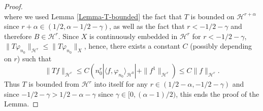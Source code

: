 \documentclass[11pt, dvipsnames]{amsart}
\begin{document}
{\begin{proof}
\begin{equation}
\end{equation}
where we used Lemma \ref{Lemma-T-bounded} the fact that $T$ is bounded on $\mathcal{H}^{r+\alpha}$ since $r+\alpha\in(1/2,\alpha-1/2-\gamma)$, as well as the fact that $r< -1/2-\gamma$ and therefore $B\in\mathcal{H}^{r}$. Since $X$ is continuously embedded in $\mathcal{H}^{r}$ for $r<-1/2-\gamma$, $\|T \varphi_{n_{0}}\|_{\mathcal{H}^{r}}\leq \|T \varphi_{n_{0}}\|_{X}$, hence, there exists a constant $C$ (possibly depending on $r$) such that
\begin{equation}
    \|T f\|_{\mathcal{H}^{r}}\leq C\left(n_{0}^{r}|\langle f, \varphi_{n_{0}}\rangle_{\mathcal{H}^{0}}|+\|f^{1}\|_{\mathcal{H}^{r}}\right)\leq C\|f\|_{\mathcal{H}^{r}}.
\end{equation}
Thus $T$ is bounded from $\mathcal{H}^{r}$ into itself for any $r\in(1/2-\alpha,-1/2-\gamma)$ and since $-1/2-\gamma >1/2-\alpha-\gamma$ since $\gamma\in[0,(\alpha-1)/2)$, this ends the proof of the Lemma.
\end{proof}
}
\end{document}
